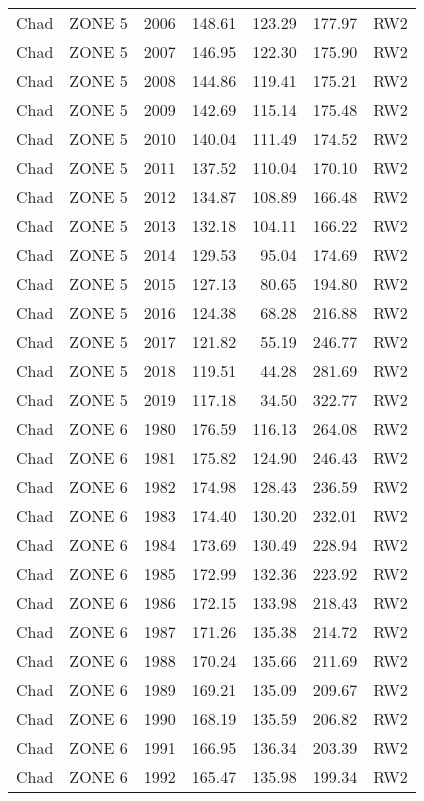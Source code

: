 \begin{longtable}{lllrrrl}
  Chad & ZONE 5 & 2006 & 148.61 & 123.29 & 177.97 & RW2 \\ 
  Chad & ZONE 5 & 2007 & 146.95 & 122.30 & 175.90 & RW2 \\ 
  Chad & ZONE 5 & 2008 & 144.86 & 119.41 & 175.21 & RW2 \\ 
  Chad & ZONE 5 & 2009 & 142.69 & 115.14 & 175.48 & RW2 \\ 
  Chad & ZONE 5 & 2010 & 140.04 & 111.49 & 174.52 & RW2 \\ 
  Chad & ZONE 5 & 2011 & 137.52 & 110.04 & 170.10 & RW2 \\ 
  Chad & ZONE 5 & 2012 & 134.87 & 108.89 & 166.48 & RW2 \\ 
  Chad & ZONE 5 & 2013 & 132.18 & 104.11 & 166.22 & RW2 \\ 
  Chad & ZONE 5 & 2014 & 129.53 & 95.04 & 174.69 & RW2 \\ 
  Chad & ZONE 5 & 2015 & 127.13 & 80.65 & 194.80 & RW2 \\ 
  Chad & ZONE 5 & 2016 & 124.38 & 68.28 & 216.88 & RW2 \\ 
  Chad & ZONE 5 & 2017 & 121.82 & 55.19 & 246.77 & RW2 \\ 
  Chad & ZONE 5 & 2018 & 119.51 & 44.28 & 281.69 & RW2 \\ 
  Chad & ZONE 5 & 2019 & 117.18 & 34.50 & 322.77 & RW2 \\ 
  Chad & ZONE 6 & 1980 & 176.59 & 116.13 & 264.08 & RW2 \\ 
  Chad & ZONE 6 & 1981 & 175.82 & 124.90 & 246.43 & RW2 \\ 
  Chad & ZONE 6 & 1982 & 174.98 & 128.43 & 236.59 & RW2 \\ 
  Chad & ZONE 6 & 1983 & 174.40 & 130.20 & 232.01 & RW2 \\ 
  Chad & ZONE 6 & 1984 & 173.69 & 130.49 & 228.94 & RW2 \\ 
  Chad & ZONE 6 & 1985 & 172.99 & 132.36 & 223.92 & RW2 \\ 
  Chad & ZONE 6 & 1986 & 172.15 & 133.98 & 218.43 & RW2 \\ 
  Chad & ZONE 6 & 1987 & 171.26 & 135.38 & 214.72 & RW2 \\ 
  Chad & ZONE 6 & 1988 & 170.24 & 135.66 & 211.69 & RW2 \\ 
  Chad & ZONE 6 & 1989 & 169.21 & 135.09 & 209.67 & RW2 \\ 
  Chad & ZONE 6 & 1990 & 168.19 & 135.59 & 206.82 & RW2 \\ 
  Chad & ZONE 6 & 1991 & 166.95 & 136.34 & 203.39 & RW2 \\ 
  Chad & ZONE 6 & 1992 & 165.47 & 135.98 & 199.34 & RW2 \\ 

\end{longtable}
